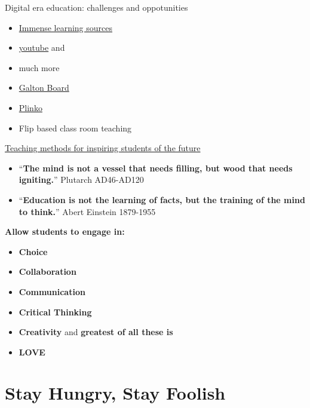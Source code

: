 \documentclass[
  ignorenonframetext,
]{beamer}
\providecommand{\tightlist}{%
  \setlength{\itemsep}{0pt}\setlength{\parskip}{0pt}}\usepackage{longtable,booktabs,array}
\begin{document}
\begin{frame}{Digital era education: challenges and oppotunities}
\protect\hypertarget{digital-era-education-challenges-and-oppotunities}{}
\begin{itemize}[<+->]
\tightlist
\item
  \href{khanacademy.com}{Immense learning sources}
\item
  \href{youtube.com}{youtube} and
\item
  much more
\item
  \href{https://galtonboard.com/}{Galton Board}
\item
  \href{https://phet.colorado.edu/sims/html/plinko-probability/latest/plinko-probability_en.html}{Plinko}
\item
  Flip based class room teaching
\end{itemize}
\end{frame}

\begin{frame}{}
\protect\hypertarget{section-6}{}
\href{https://www.youtube.com/watch?v=UCFg9bcW7Bk}{Teaching methods for
inspiring students of the future}

\begin{itemize}[<+->]
\item
  ``\textbf{The mind is not a vessel that needs filling, but wood that
  needs igniting.}'' Plutarch AD46-AD120
\item
  ``\textbf{Education is not the learning of facts, but the training of
  the mind to think.}'' Abert Einstein 1879-1955
\end{itemize}
\end{frame}

\begin{frame}{}
\protect\hypertarget{section-7}{}
\textbf{Allow students to engage in:}

\begin{itemize}[<+->]
\item
  \textbf{Choice}
\item
  \textbf{Collaboration}
\item
  \textbf{Communication}
\item
  \textbf{Critical Thinking}
\item
  \textbf{Creativity} and {\textbf{greatest of all these is}}
\item
  {\textbf{LOVE}}
\end{itemize}
\end{frame}

\hypertarget{stay-hungry-stay-foolish}{%
\section{\texorpdfstring{{Stay Hungry, Stay
Foolish}}{Stay Hungry, Stay Foolish}}\label{stay-hungry-stay-foolish}}
\end{document}
